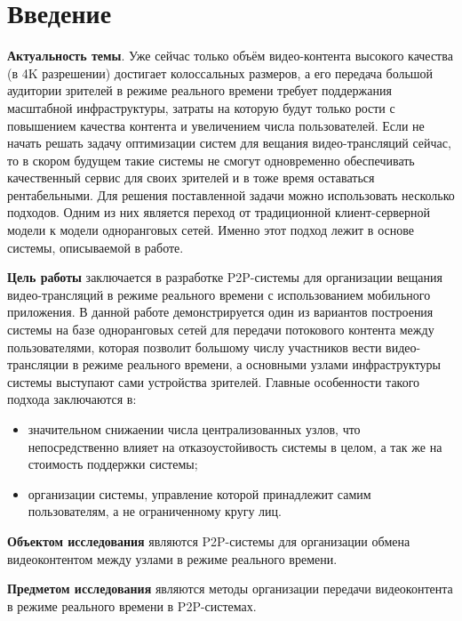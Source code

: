 
\tableofcontents
\newpage

\section{Введение}
	\textbf{Актуальность темы}. Уже сейчас только объём видео-контента высокого качества (в 4K разрешении) достигает
	колоссальных размеров, а его передача большой аудитории зрителей в режиме реального времени требует поддержания
	масштабной инфраструктуры, затраты на которую будут только рости с повышением качества контента и увеличением числа
	пользователей. Если не начать решать задачу оптимизации систем для вещания видео-трансляций сейчас, то в
	скором будущем такие системы не смогут одновременно обеспечивать качественный сервис для своих зрителей и в тоже
	время оставаться рентабельными. Для решения поставленной задачи можно использовать несколько подходов. Одним из них
	является переход от традиционной клиент-серверной модели к модели одноранговых сетей. Именно этот подход лежит в
	основе системы, описываемой в работе.

	\textbf{Цель работы} заключается в разработке P2P-системы для организации вещания видео-трансляций в режиме
	реального времени с использованием мобильного приложения. В данной работе демонстрируется один из вариантов
	построения системы на базе одноранговых сетей для передачи потокового контента между пользователями, которая
	позволит большому числу участников вести  видео-трансляции в режиме реального времени, а основными узлами
	инфраструктуры системы выступают сами устройства зрителей. Главные особенности такого подхода заключаются в:
	\begin{itemize}
		\item значительном снижаении числа централизованных узлов, что непосредственно влияет на отказоустойивость
		системы в целом, а так же на стоимость поддержки системы;
		\item организации системы, управление которой принадлежит самим пользователям, а не ограниченному кругу лиц.
	\end{itemize}

	\textbf{Объектом исследования} являются P2P-системы для организации обмена видеоконтентом между узлами в режиме
	реального времени.

	\textbf{Предметом исследования} являются методы организации передачи видеоконтента в режиме реального времени в
	P2P-системах.

